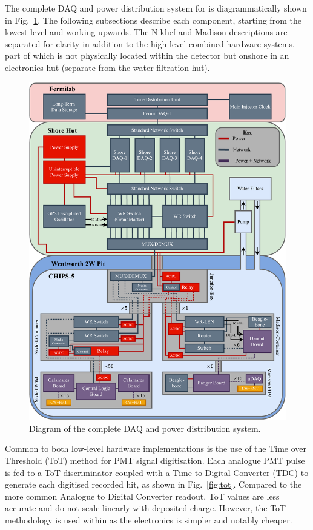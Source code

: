 The complete DAQ and power distribution system for \chipsfive is diagrammatically shown in
Fig.~\ref{fig:daq}. The following subsections describe each component, starting from the lowest
level and working upwards. The Nikhef and Madison descriptions are separated for clarity in
addition to the high-level combined hardware systems, part of which is not physically located
within the detector but onshore in an electronics hut (separate from the water filtration hut).

\begin{figure} %
    \includegraphics[width=\textwidth]{diagrams/5-daq/daq.pdf}
    \caption[Diagram of the complete \chipsfive data acquisition and power distribution system]
    {Diagram of the complete \chipsfive DAQ and power distribution system.}
    \label{fig:daq}
\end{figure}

Common to both low-level hardware implementations is the use of the Time over Threshold (ToT)
method for PMT signal digitisation. Each analogue PMT pulse is fed to a ToT discriminator coupled
with a Time to Digital Converter (TDC) to generate each digitised recorded hit, as shown in
Fig.~\ref{fig:tot}. Compared to the more common Analogue to Digital Converter readout, ToT values
are less accurate and do not scale linearly with deposited charge. However, the ToT methodology is
used within \chips as the electronics is simpler and notably cheaper.

